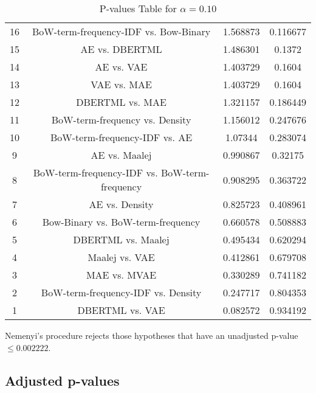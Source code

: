 \documentclass[a4paper,10pt]{article}
\begin{document}
\begin{landscape}
\begin{table}[!htp]
\begin{tabular}{cccc}
16&BoW-term-frequency-IDF vs. Bow-Binary&1.568873&0.116677\\
15&AE vs. DBERTML&1.486301&0.1372\\
14&AE vs. VAE&1.403729&0.1604\\
13&VAE vs. MAE&1.403729&0.1604\\
12&DBERTML vs. MAE&1.321157&0.186449\\
11&BoW-term-frequency vs. Density&1.156012&0.247676\\
10&BoW-term-frequency-IDF vs. AE&1.07344&0.283074\\
9&AE vs. Maalej&0.990867&0.32175\\
8&BoW-term-frequency-IDF vs. BoW-term-frequency&0.908295&0.363722\\
7&AE vs. Density&0.825723&0.408961\\
6&Bow-Binary vs. BoW-term-frequency&0.660578&0.508883\\
5&DBERTML vs. Maalej&0.495434&0.620294\\
4&Maalej vs. VAE&0.412861&0.679708\\
3&MAE vs. MVAE&0.330289&0.741182\\
2&BoW-term-frequency-IDF vs. Density&0.247717&0.804353\\
1&DBERTML vs. VAE&0.082572&0.934192\\
\hline
\end{tabular}
\caption{P-values Table for $\alpha=0.10$}
\end{table}Nemenyi's procedure rejects those hypotheses that have an unadjusted p-value $\le0.002222$.

\pagebreak

\subsection{Adjusted p-values}


\end{landscape}
\end{document}
